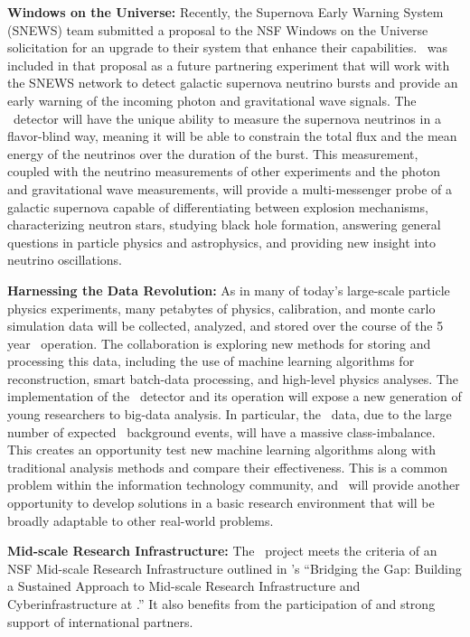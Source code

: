 {\bf Windows on the Universe:}
Recently, the Supernova Early Warning System (SNEWS) team submitted a proposal to the NSF Windows on the Universe solicitation for an upgrade to their system that enhance their capabilities.  \DSks\ was included in that proposal as a future partnering experiment that will work with the SNEWS network to detect galactic supernova neutrino bursts and provide an early warning of the incoming photon and gravitational wave signals.  The \DSks\ detector will have the unique ability to measure the supernova neutrinos in a flavor-blind way, meaning it will be able to constrain the total flux and the mean energy of the neutrinos over the duration of the burst.  This measurement, coupled with the neutrino measurements of other experiments and the photon and gravitational wave measurements, will provide a multi-messenger probe of a galactic supernova capable of differentiating between explosion mechanisms, characterizing neutron stars, studying black hole formation, answering general questions in particle physics and astrophysics, and providing new insight into neutrino oscillations.

{\bf Harnessing the Data Revolution:}
As in many of today's large-scale particle physics experiments, many petabytes of physics, calibration, and monte carlo simulation data will be collected, analyzed, and stored over the course of the 5 year \DSks\ operation. The collaboration is exploring new methods for storing and processing this data, including the use of machine learning algorithms for reconstruction, smart batch-data processing, and high-level physics analyses.  The implementation of the \DSks\ detector and its operation will expose a new generation of young researchers to big-data analysis. In particular, the \DSks\ data, due to the large number of expected \ER\ background events,  will have a massive class-imbalance. This creates an opportunity test new machine learning algorithms along with traditional analysis methods and compare their effectiveness.  This is a common problem within the information technology community, and \DSks\ will provide another opportunity to develop solutions in a basic research environment that will be broadly adaptable to other real-world problems.

{\bf Mid-scale Research Infrastructure:}
The \DSks\ project meets the criteria of an NSF Mid-scale Research Infrastructure outlined in \NSF's ``Bridging the Gap: Building a Sustained Approach to Mid-scale Research Infrastructure and Cyberinfrastructure at \NSF.'' It also benefits from the participation of and strong support of  international partners.

